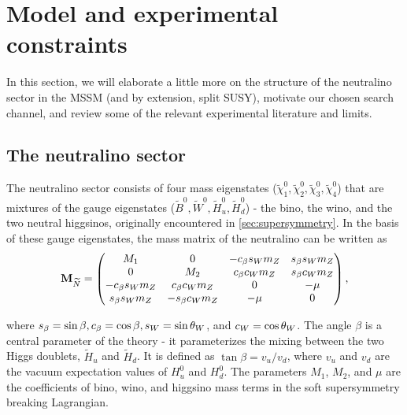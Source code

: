\section{Model and experimental constraints}\label{sec:model}

In this section, we will elaborate a little more on the structure of the neutralino sector in the MSSM (and by extension, split SUSY), motivate our chosen search channel, and review some of the relevant experimental literature and limits.

\subsection{The neutralino sector}
The neutralino sector consists of four mass eigenstates ($\widetilde{\chi}_1^0,\widetilde{\chi}_2^0,\widetilde{\chi}_3^0,\widetilde{\chi}_4^0$)  that are mixtures of the gauge eigenstates ($\widetilde{B}^0,\widetilde{W}^0,\widetilde{H}_u^0,\widetilde{H}^0_d$) - the bino, the wino, and the two neutral higgsinos, originally encountered in \autoref{sec:supersymmetry}. In the basis of these gauge eigenstates, the mass matrix of the neutralino can be written as
\[\mathbf{M}_{\widetilde{N}}=
\begin{pmatrix}
  M_1 & 0 & -c_\beta s_Wm_Z & s_\beta s_Wm_Z \\
  0 & M_2 & c_\beta c_Wm_Z & s_\beta c_Wm_Z \\
  -c_\beta s_Wm_Z & c_\beta c_Wm_Z & 0 & -\mu \\
  s_\beta s_Wm_Z & -s_\beta c_Wm_Z & -\mu & 0
\end{pmatrix},\]

\noindent where $s_\beta = \sin\beta, c_\beta = \cos\beta, s_W = \sin\theta_{W}$,  and  $c_W = \cos\theta_W$. The angle $\beta$ is a central parameter of the theory - it parameterizes the mixing between the two Higgs doublets, $\widetilde{H}_u$ and $\widetilde{H}_d$. It is defined as $\tan\beta = v_u/v_d$, where $v_u$ and $v_d$ are the vacuum expectation values of $H_u^0$ and $H_d^0$. The parameters $M_1$, $M_2$, and $\mu$ are the coefficients of bino, wino, and higgsino mass terms in the soft supersymmetry breaking Lagrangian.

